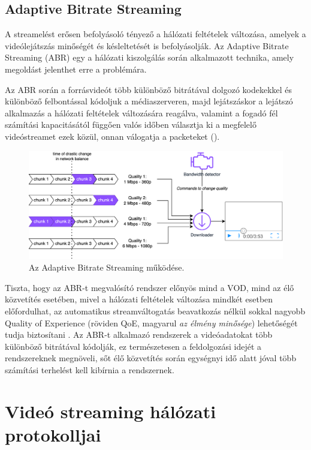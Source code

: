 \subsection{Adaptive Bitrate Streaming}

A streamelést erősen befolyásoló tényező a hálózati feltételek változása, amelyek a videólejátszás minőségét és késleltetését is befolyásolják. Az Adaptive Bitrate Streaming (ABR) egy a hálózati kiszolgálás során alkalmazott technika, amely megoldást jelenthet erre a problémára.

Az ABR során a forrásvideót több különböző bitrátával dolgozó kodekekkel és különböző felbontással kódoljuk a médiaszerveren, majd lejátszáskor a lejátszó alkalmazás a hálózati feltételek változására reagálva, valamint a fogadó fél számítási kapacitásától függően valós időben választja ki a megfelelő vi\-de\-ó\-strea\-met ezek közül, onnan válogatja a packeteket ().

\begin{figure}[ht]
	\centering
	\includegraphics[width=140mm, keepaspectratio]{figures/dipterv_abr.png}
	\caption{Az Adaptive Bitrate Streaming működése.}
	\label{fig:ABR}
\end{figure}

Tiszta, hogy az ABR-t megvalósító rendszer előnyös mind a VOD, mind az élő közvetítés esetében, mivel a hálózati feltételek változása mindkét esetben előfordulhat, az automatikus streamváltogatás beavatkozás nélkül sokkal nagyobb Quality of Experience (röviden QoE, magyarul \emph{az élmény minősége}) lehetőségét tudja biztosítani \cite{DashAbr}. Az ABR-t alkalmazó rendszerek a videóadatokat több különböző bitrátával kódolják, ez természetesen a feldolgozási idejét a rendszereknek megnöveli, sőt élő közvetítés során egységnyi idő alatt jóval több számítási terhelést kell kibírnia a rendszernek.

\section{Videó streaming hálózati protokolljai}

